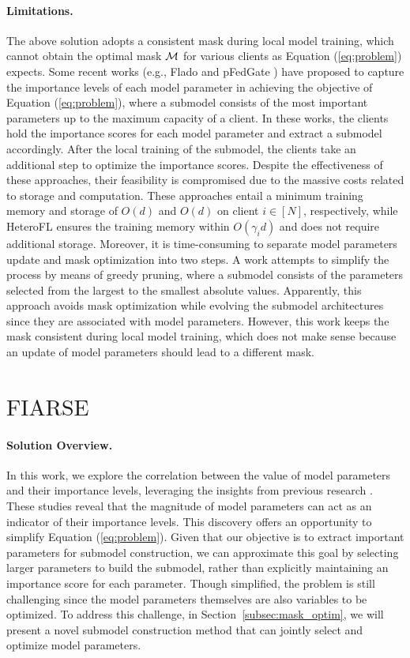 \documentclass{article}
\renewcommand{\cite}{\citep}
\theoremstyle{plain}
\theoremstyle{definition}
\theoremstyle{remark}
\newcommand{\algo}{\ensuremath{\text{FIARSE}}\xspace}
\renewcommand{\eqref}[1]{Equation (\ref{#1})}
\begin{document}
\paragraph{Limitations.}
The above solution adopts a consistent mask during local model training, which cannot obtain the optimal mask $\mask$ for various clients as \eqref{eq:problem} expects. Some recent works (e.g., Flado \cite{liao2023adaptive} and pFedGate \cite{chen2023efficient}) have proposed to capture the importance levels of each model parameter in achieving the objective of \eqref{eq:problem}, where a submodel consists of the most important parameters up to the maximum capacity of a client. In these works, the clients hold the importance scores for each model parameter and extract a submodel accordingly. After the local training of the submodel, the clients take an additional step to optimize the importance scores. Despite the effectiveness of these approaches, their feasibility is compromised due to the massive costs related to storage and computation. These approaches entail a minimum training memory and storage of $O(d)$ and $O(d)$ on client $i \in [N]$, respectively, while HeteroFL \cite{diao2020heterofl} ensures the training memory within $O(\gamma_i d)$ and does not require additional storage. Moreover, it is time-consuming to separate model parameters update and mask optimization into two steps. A work \cite{zhou2023every} attempts to simplify the process by means of greedy pruning, where a submodel consists of the parameters selected from the largest to the smallest absolute values. Apparently, this approach avoids mask optimization while evolving the submodel architectures since they are associated with model parameters. However, this work keeps the mask consistent during local model training, which does not make sense because an update of model parameters should lead to a different mask. 


\section{\algo} \label{sec:algo}

\paragraph{Solution Overview.} 

In this work, we explore the correlation between the value of model parameters and their importance levels, leveraging the insights from previous research \cite{mostafa2019parameter, jayakumar2020top}. These studies reveal that the magnitude of model parameters can act as an indicator of their importance levels. This discovery offers an opportunity to simplify \eqref{eq:problem}. Given that our objective is to extract important parameters for submodel construction, we can approximate this goal by selecting larger parameters to build the submodel, rather than explicitly maintaining an importance score for each parameter.  Though simplified, the problem is still challenging since the model parameters themselves are also variables to be optimized. To address this challenge, in Section~\ref{subsec:mask_optim}, we will present a novel submodel construction method that can jointly select and optimize model parameters.
\end{document}
